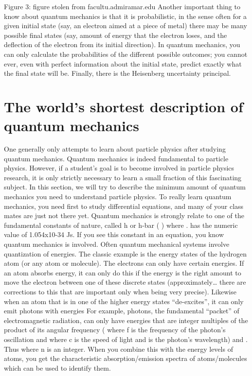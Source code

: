 Figure 3: figure stolen from facultu.admiramar.edu
Another important thing to know about quantum mechanics is that it is probabilistic, in the sense often for a given initial state (say, an electron aimed at a piece of metal) there may be many possible final states (say, amount of energy that the electron loses, and the deflection of the electron from its initial direction).  In quantum mechanics, you can only calculate the probabilities of the different possible outcomes; you cannot ever, even with perfect information about the initial state, predict exactly what the final state will be.
Finally, there is the Heisenberg uncertainty principal.  


\section{The world's shortest description of quantum mechanics}

One generally only attempts to learn about particle physics after studying quantum mechanics.  Quantum mechanics is indeed fundamental to particle physics.  However, if a student’s goal is to become involved in particle physics research, it is only strictly necessary to learn a small fraction of this fascinating subject.  In this section, we will try to describe the minimum amount of quantum mechanics you need to understand particle physics.  To really learn quantum mechanics, you need first to study differential equations, and many of your class mates are just not there yet.
Quantum mechanics is strongly relate to one of the fundamental constants of nature, called h or h-bar (  ) where  .    has the numeric value of 1.054x10-34 Js.  If you see this constant in an equation, you know quantum mechanics is involved.
Often quantum mechanical systems involve quantization of energies.  The classic example is the energy states of the hydrogen atom (or any atom or molecule).  The electrons can only have certain energies.  If an atom absorbs energy, it can only do this if the energy is the right amount to move the electron between one of these discrete states (approximately… there are corrections to this that are important only when being very precise).  Likewise when an atom that is in one of the higher energy states “de-excites”, it can only emit photons with energies
For example, photons, the fundamental “packet” of electromagnetic radiation, can only have energies that are integer multiples of the product of its angular frequency (  where f is the frequency of the photon’s oscillation and   where c is the speed of light and   is the photon’s wavelength) and .  Thus   where n is an integer.
When you combine this with the energy levels of atoms, you get the characteristic absorption/emission spectra of atoms/molecules which can be used to identify them.


